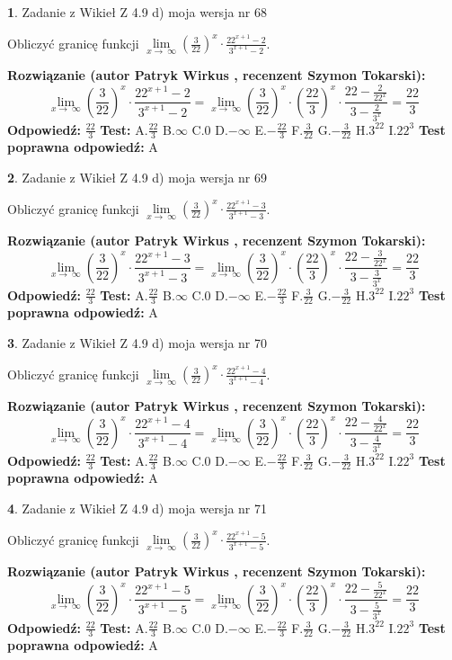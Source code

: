 \documentclass[12pt, a4paper]{article}
\theoremstyle{definition} %
\newtheorem{zad}{}
\newcommand{\zadStart}[1]{\begin{zad}#1\newline}
\newcommand{\zadStop}{\end{zad}}
\newcommand{\rozwStart}[2]{\noindent \textbf{Rozwiązanie (autor #1 , recenzent #2): }\newline}
\newcommand{\rozwStop}{\newline}
\newcommand{\odpStart}{\noindent \textbf{Odpowiedź:}\newline}
\newcommand{\odpStop}{\newline}
\newcommand{\testStart}{\noindent \textbf{Test:}\newline}
\newcommand{\testStop}{\newline}
\newcommand{\kluczStart}{\noindent \textbf{Test poprawna odpowiedź:}\newline}
\newcommand{\kluczStop}{\newline}
\begin{document}
\zadStart{Zadanie z Wikieł Z 4.9 d) moja wersja nr 68}


Obliczyć granicę funkcji  $\lim\limits_{x\to\ \infty}(\frac{3}{22})^{x}\cdot\frac{22^{x+1}-2}{3^{x+1}-2}$.
\zadStop
\rozwStart{Patryk Wirkus}{Szymon Tokarski}
$$\lim\limits_{x\to\ \infty}(\frac{3}{22})^{x}\cdot\frac{22^{x+1}-2}{3^{x+1}-2}=\lim\limits_{x\to\ \infty}(\frac{3}{22})^{x}\cdot(\frac{22}{3})^{x} \cdot \frac{22-\frac{2}{22^{x}}}{3-\frac{2}{3^{x}}} = \frac{22}{3}$$
\rozwStop
\odpStart
$\frac{22}{3}$
\odpStop
\testStart
A.$\frac{22}{3}$ B.$\infty$ C.$0$ D.$-\infty$ E.$-\frac{22}{3}$
F.$\frac{3}{22}$ G.$-\frac{3}{22}$
H.$3^{22}$
I.$22^{3}$
\testStop
\kluczStart
A
\kluczStop



\zadStart{Zadanie z Wikieł Z 4.9 d) moja wersja nr 69}


Obliczyć granicę funkcji  $\lim\limits_{x\to\ \infty}(\frac{3}{22})^{x}\cdot\frac{22^{x+1}-3}{3^{x+1}-3}$.
\zadStop
\rozwStart{Patryk Wirkus}{Szymon Tokarski}
$$\lim\limits_{x\to\ \infty}(\frac{3}{22})^{x}\cdot\frac{22^{x+1}-3}{3^{x+1}-3}=\lim\limits_{x\to\ \infty}(\frac{3}{22})^{x}\cdot(\frac{22}{3})^{x} \cdot \frac{22-\frac{3}{22^{x}}}{3-\frac{3}{3^{x}}} = \frac{22}{3}$$
\rozwStop
\odpStart
$\frac{22}{3}$
\odpStop
\testStart
A.$\frac{22}{3}$ B.$\infty$ C.$0$ D.$-\infty$ E.$-\frac{22}{3}$
F.$\frac{3}{22}$ G.$-\frac{3}{22}$
H.$3^{22}$
I.$22^{3}$
\testStop
\kluczStart
A
\kluczStop



\zadStart{Zadanie z Wikieł Z 4.9 d) moja wersja nr 70}


Obliczyć granicę funkcji  $\lim\limits_{x\to\ \infty}(\frac{3}{22})^{x}\cdot\frac{22^{x+1}-4}{3^{x+1}-4}$.
\zadStop
\rozwStart{Patryk Wirkus}{Szymon Tokarski}
$$\lim\limits_{x\to\ \infty}(\frac{3}{22})^{x}\cdot\frac{22^{x+1}-4}{3^{x+1}-4}=\lim\limits_{x\to\ \infty}(\frac{3}{22})^{x}\cdot(\frac{22}{3})^{x} \cdot \frac{22-\frac{4}{22^{x}}}{3-\frac{4}{3^{x}}} = \frac{22}{3}$$
\rozwStop
\odpStart
$\frac{22}{3}$
\odpStop
\testStart
A.$\frac{22}{3}$ B.$\infty$ C.$0$ D.$-\infty$ E.$-\frac{22}{3}$
F.$\frac{3}{22}$ G.$-\frac{3}{22}$
H.$3^{22}$
I.$22^{3}$
\testStop
\kluczStart
A
\kluczStop



\zadStart{Zadanie z Wikieł Z 4.9 d) moja wersja nr 71}


Obliczyć granicę funkcji  $\lim\limits_{x\to\ \infty}(\frac{3}{22})^{x}\cdot\frac{22^{x+1}-5}{3^{x+1}-5}$.
\zadStop
\rozwStart{Patryk Wirkus}{Szymon Tokarski}
$$\lim\limits_{x\to\ \infty}(\frac{3}{22})^{x}\cdot\frac{22^{x+1}-5}{3^{x+1}-5}=\lim\limits_{x\to\ \infty}(\frac{3}{22})^{x}\cdot(\frac{22}{3})^{x} \cdot \frac{22-\frac{5}{22^{x}}}{3-\frac{5}{3^{x}}} = \frac{22}{3}$$
\rozwStop
\odpStart
$\frac{22}{3}$
\odpStop
\testStart
A.$\frac{22}{3}$ B.$\infty$ C.$0$ D.$-\infty$ E.$-\frac{22}{3}$
F.$\frac{3}{22}$ G.$-\frac{3}{22}$
H.$3^{22}$
I.$22^{3}$
\testStop
\kluczStart
A
\kluczStop
\end{document}
